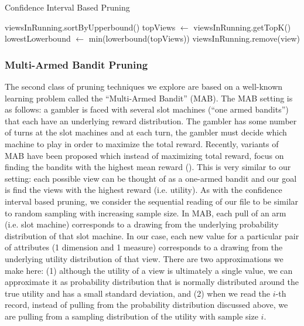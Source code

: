 \begin{algorithm}
\caption{Confidence Interval Based Pruning}
\label{algo:ci_based_pruning}
\begin{algorithmic}[1]
\State viewsInRunning.sortByUpperbound()
\State topViews $\gets$ viewsInRunning.getTopK()
\State lowestLowerbound $\gets$ min(lowerbound(topViews))
\State viewsInRunning.remove(view)
\EndIf
\EndFor
\end{algorithmic}
\end{algorithm}

\subsubsection{Multi-Armed Bandit Pruning}
\label{sec:multi_armed_bandit}
The second class of pruning techniques we explore are based on a
well-known learning problem called the ``Multi-Armed Bandit'' (MAB).
The MAB setting is as follows: a gambler is faced with several slot
machines (``one armed bandits'') that each have an underlying reward
distribution. 
The gambler has some number of turns at the slot machines and at
each turn, the gambler must decide which machine to play in order to maximize
the total reward.
Recently, variants of MAB have been proposed which instead of maximizing total
reward, focus on finding the bandits with the highest
mean reward (\cite{}).
This is very similar to our setting: each possible view can be thought of as a
one-armed bandit and our goal is find the views with the highest reward (i.e.
utility).
As with the confidence interval based pruning, we consider the sequential
reading of our file to be similar to random sampling with increasing sample
size.
In MAB, each pull of an arm (i.e. slot machine) corresponds to a drawing from
the underlying probability distribution of that slot machine.
In our case, each new value for a particular pair of attributes (1 dimension and
1 measure) corresponds to a drawing from the underlying utility distribution
of that view.
There are two approximations we make here: (1) although the utility of a
view is ultimately a single value, we can approximate it as probability
distribution that is normally distributed around the true utility and has a
small standard deviation, and (2) when we read the $i$-th record, instead of
pulling from the probability distribution discussed above, we are pulling from a
sampling distribution of the utility with sample size $i$.

